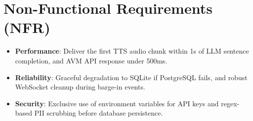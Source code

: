 \section{Non-Functional Requirements (NFR)}

\begin{itemize}
    \item \textbf{Performance}: Deliver the first TTS audio chunk within 1s of LLM sentence completion, and AVM API response under 500ms.
    \item \textbf{Reliability}: Graceful degradation to SQLite if PostgreSQL fails, and robust WebSocket cleanup during barge-in events.
    \item \textbf{Security}: Exclusive use of environment variables for API keys and regex-based PII scrubbing before database persistence.
\end{itemize}
